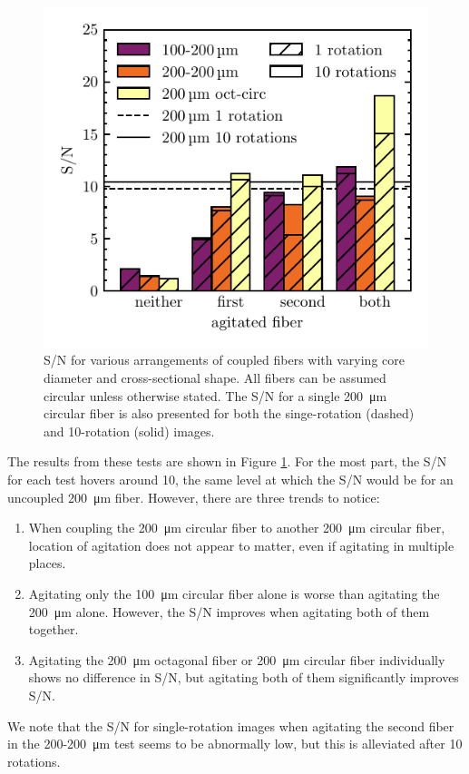 \begin{figure}
\centering
	\includegraphics[width=\columnwidth]{figures-2/coupled_fibers.pdf}
	\caption[Signal-to-noise comparison across fiber shapes]{S/N for various arrangements of coupled fibers with varying core diameter and cross-sectional shape. All fibers can be assumed circular unless otherwise stated. The S/N for a single \SI{200}{\micro\meter} circular fiber is also presented for both the singe-rotation (dashed) and 10-rotation (solid) images.}
\label{fig:coupled_fibers}
\end{figure}

The results from these tests are shown in Figure \ref{fig:coupled_fibers}. For the most part, the S/N for each test hovers around 10, the same level at which the S/N would be for an uncoupled \SI{200}{\micro\meter} fiber. However, there are three trends to notice:
\begin{enumerate}
\item When coupling the \SI{200}{\micro\meter} circular fiber to another \SI{200}{\micro\meter} circular fiber, location of agitation does not appear to matter, even if agitating in multiple places.
\item Agitating only the \SI{100}{\micro\meter} circular fiber alone is worse than agitating the \SI{200}{\micro\meter} alone. However, the S/N improves when agitating both of them together.
\item Agitating the \SI{200}{\micro\meter} octagonal fiber or \SI{200}{\micro\meter} circular fiber individually shows no difference in S/N, but agitating both of them significantly improves S/N.
\end{enumerate}
We note that the S/N for single-rotation images when agitating the second fiber in the 200-\SI{200}{\micro\meter} test seems to be abnormally low, but this is alleviated after 10 rotations.

